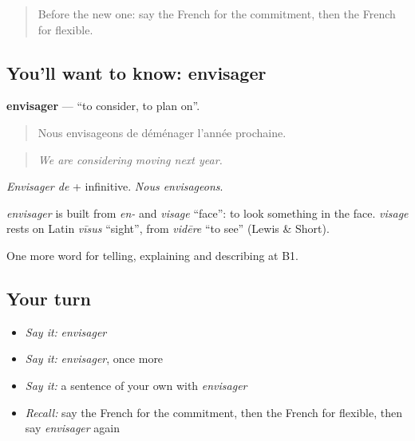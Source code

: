 \label{lesson:FR-C373-envisager}



\begin{quote}
Before the new one: say the French for the commitment, then the French for flexible.
\end{quote}

\subsection*{You'll want to know: envisager}
\textbf{envisager} — \textquotedblleft{}to consider, to plan on\textquotedblright{}.

\begin{quote}
Nous envisageons de déménager l'année prochaine.
\end{quote}

\begin{quote}
\emph{We are considering moving next year.}
\end{quote}

\emph{Envisager de} + infinitive. \emph{Nous envisageons}.

\begin{cousinweb}
\emph{envisager} is built from \emph{en-} and \emph{visage} \textquotedblleft{}face\textquotedblright{}: to look something in the face. \emph{visage} rests on Latin \emph{vīsus} \textquotedblleft{}sight\textquotedblright{}, from \emph{vidēre} \textquotedblleft{}to see\textquotedblright{} (Lewis \& Short).
\end{cousinweb}

\begin{grammarlens}[title={What you've built}]
One more word for telling, explaining and describing at B1.
\end{grammarlens}

\subsection*{Your turn}
\begin{itemize}
\raggedright
  \item \emph{Say it:} \emph{envisager}
  \item \emph{Say it:} \emph{envisager}, once more
  \item \emph{Say it:} a sentence of your own with \emph{envisager}
  \item \emph{Recall:} say the French for the commitment, then the French for flexible, then say \emph{envisager} again
\end{itemize}

